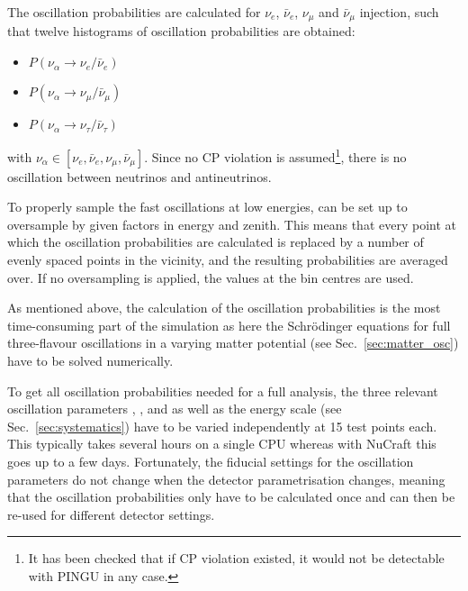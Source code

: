 The oscillation probabilities are calculated for $\nu_e$, $\bar\nu_e$, $\nu_\mu$
and $\bar\nu_\mu$ injection, such that twelve histograms of oscillation
probabilities are obtained:
\begin{itemize}
 \item $P(\nu_\alpha \to \nu_e/\bar\nu_e)$
 \item $P(\nu_\alpha \to \nu_\mu/\bar\nu_\mu)$
 \item $P(\nu_\alpha \to \nu_\tau/\bar\nu_\tau)$
\end{itemize}
with $\nu_\alpha \in \left[\nu_e,\bar\nu_e,\nu_\mu,\bar\nu_\mu\right]$. Since
no CP violation is assumed\footnote{It has been checked that if CP violation
existed, it would not be detectable with PINGU in any case.}, there is no
oscillation between neutrinos and antineutrinos.


To properly sample the fast oscillations at low energies, \papa can be set up
to oversample by given factors in energy and zenith. This means that every
point at which the oscillation probabilities are calculated is replaced by a
number of evenly spaced points in the vicinity, and the resulting probabilities
are averaged over. If no oversampling is applied, the values at the bin
centres are used.

As mentioned above, the calculation of the oscillation probabilities is the 
most time-consuming part of the simulation as here the Schr\"odinger equations 
for full three-flavour oscillations in a varying matter 
potential (see Sec.~\ref{sec:matter_osc}) have to be solved numerically.

To get all oscillation probabilities needed for a full analysis, the three
relevant oscillation parameters , , and  as well as the
energy scale (see Sec.~\ref{sec:systematics}) have to be varied independently at
15 test points each. This typically takes several hours on a single CPU whereas
with NuCraft this goes up to a few days. Fortunately, the fiducial settings for
the oscillation parameters do not change when the detector parametrisation
changes, meaning that the oscillation probabilities only have to be calculated
once and can then be re-used for different detector settings.


